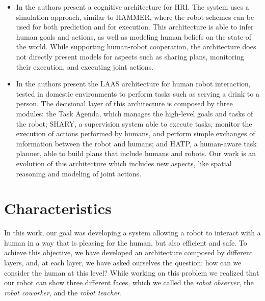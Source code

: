 \begin{itemize}
\item In \cite{BreazealGB09} the authors present a cognitive architecture for HRI. The system uses a simulation approach, similar to HAMMER, where the robot schemes can be used for both prediction and for execution. This architecture is able to infer human goals and actions, as well as modeling human beliefs on the state of the world. While supporting human-robot cooperation, the architecture does not directly present models for aspects such as sharing plans, monitoring their execution, and executing joint actions. 

\item In \cite{clodic2009shary} the authors present the LAAS architecture
 for human robot interaction, tested in domestic environments to
perform tasks such as serving a drink to a person. The decisional layer of this architecture
is composed by three modules: the Task Agenda, which manages the high-level goals and tasks of the 
robot; SHARY, a supervision system able to execute tasks, monitor the execution of actions performed by humans, and perform simple exchanges of information between the robot and humans; and HATP, a human-aware task planner, able to build plans that include humans and robots. Our work is an evolution of this architecture which includes new aspects, like spatial
reasoning and modeling of joint actions.

\end{itemize}

\section{Characteristics}
\label{sec:overview-characteristics}

In this work, our goal was developing a system allowing a robot to interact with a human in a way that is pleasing for the human, but also efficient and safe. To achieve this objective, we have developed an architecture composed by different layers, and, at each layer, we have asked ourselves the question: how can we consider the human at this level? While working on this problem we realized that our robot can show three different faces, which we called the \textit{robot observer}, the \textit{robot coworker}, and the \textit{robot teacher}.

